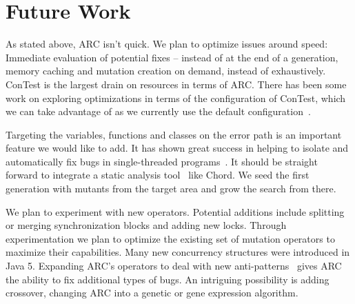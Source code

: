 \section{Future Work}
\label{sec:future_work}

As stated above, ARC isn't quick.  We plan to optimize issues around speed:
Immediate evaluation of potential fixes -- instead of at the end of a
generation, memory caching and mutation creation on demand, instead of
exhaustively. ConTest is the largest drain on resources in terms of ARC. There
has been some work on exploring optimizations in terms of the configuration of
ConTest, which we can take advantage of as we currently use the default
configuration~\cite{KLVU10}.

Targeting the variables, functions and classes on the error path is an
important feature  we would like to add. It has shown great success in helping
to isolate and automatically fix bugs in single-threaded programs~\cite{FNWG09,
WNLF09, NWLF09, WFGN10, GNFW11, LDFW12}. It should be straight forward to
integrate a static analysis tool~\cite{HP04, NPSG09, NWLF09} like Chord.  We
seed the first generation with mutants from the target area and grow the search
from there.

We plan to experiment with new operators. Potential additions include splitting
or merging synchronization blocks and adding new locks. Through experimentation
we plan to optimize the existing set of mutation operators to maximize their
capabilities.  Many new concurrency structures were introduced in Java 5.
Expanding ARC's operators to deal with new anti-patterns~\cite{BJ09, FKLV12,
BCD06} gives ARC the ability to fix additional types of bugs. An intriguing
possibility is adding crossover, changing ARC into a genetic or gene expression
algorithm.
